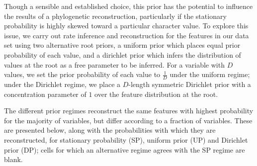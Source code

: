 \documentclass[12pt]{article}
\begin{document}
\begin{appendices}
Though a sensible and established choice, this prior has the potential to influence the results of a phylogenetic reconstruction, particularly if the stationary probability is highly skewed toward a particular character value. 
To explore this issue, we carry out rate inference and reconstruction for the features in our data set using two alternative root priors, a {\sc uniform} prior which places equal prior probability of each value, and a {\sc dirichlet} prior which infers the distribution of values at the root as a free parameter to be inferred. For a variable with $D$ values, we set the prior probability of each value to $\frac{1}{D}$ under the uniform regime; under the Dirichlet regime, we place a $D$-length symmetric Dirichlet prior with a concentration parameter of $1$ over the feature distribution at the root.

The different prior regimes reconstruct the same features with highest probability for the majority of variables, but differ according to a fraction of variables. These are presented below, along with the probabilities with which they are reconstructed, for stationary probability (SP), uniform prior (UP) and Dirichlet prior (DP); cells for which an alternative regime agrees with the SP regime are blank.


\end{appendices}
\end{document}
